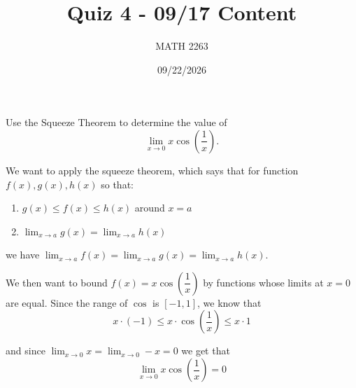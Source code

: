 \documentclass[addpoints,12pt]{exam}
\title{\vspace{-0.5in}Quiz 4 - 09/17 Content}
\date{09/22/2026}
\author{MATH 2263}
\begin{document}
  \NameSection
  {\let\newpage\relax\maketitle}

  \PointsSection

  \newpage
  \begin{questions}
    \question[5] Use the Squeeze Theorem to determine the value of
    \begin{equation*}
      \lim\limits_{x \rightarrow 0} x \cos \left( \dfrac{1}{x} \right) .
    \end{equation*}
    \begin{solution}
      We want to apply the squeeze theorem, which says that
      for function $f(x), g(x), h(x)$ so that:
      \begin{enumerate}
        \item $g(x) \leq f(x) \leq h(x)$ around $x = a$
        \item $\lim_{x \rightarrow a}g(x) = \lim_{x \rightarrow a} h(x)$
      \end{enumerate}
      we have $\lim_{x \rightarrow a}f(x) = \lim_{x\rightarrow a}g(x) = \lim_{x \rightarrow a}h(x)$.

      We then want to bound $f(x) = x \cos \left( \dfrac{1}{x} \right)$
      by functions whose limits at $x = 0$ are equal. Since the range of $\cos$ is $[-1,1]$, we know that
      \begin{equation}
        x \cdot (-1) \leq x \cdot \cos \left( \dfrac{1}{x}\right) \leq x \cdot 1
      \end{equation}

      and since $\lim_{x \rightarrow 0} x = \lim_{x \rightarrow 0} -x = 0$
      we get that
      \begin{equation}
        \lim_{x \rightarrow 0} x \cos \left ( \dfrac{1}{x}\right) = 0
      \end{equation}
    \end{solution}
  \end{questions}
\end{document}
